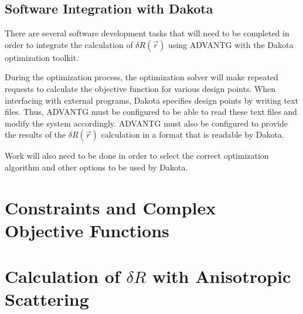 \subsection{Software Integration with Dakota}
\label{sec:proposal:software_integration_with_dakota}

There are several software development tasks that will need to be completed in order to integrate the calculation of $\delta R\left(\vec{r}\right)$ using ADVANTG with the Dakota optimization toolkit.

During the optimization process, the optimization solver will make repeated requests to calculate the objective function for various design points.
When interfacing with external programs, Dakota specifies design points by writing text files.
Thus, ADVANTG must be configured to be able to read these text files and modify the system accordingly.
ADVANTG must also be configured to provide the results of the $\delta R\left(\vec{r}\right)$ calculation in a format that is readable by Dakota.

Work will also need to be done in order to select the correct optimization algorithm and other options to be used by Dakota.

\section{Constraints and Complex Objective Functions}
\label{sec:proposal:constraints_and_complex_objective_functions}


\section{Calculation of $\delta R$ with Anisotropic Scattering}
\label{sec:proposal:anisotropic_scattering}

